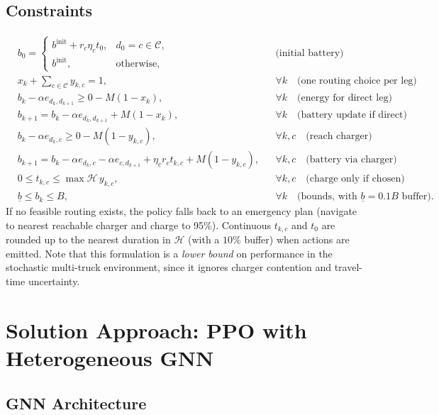 \documentclass[11pt]{article}
\begin{document}
\subsection*{Constraints}
\begin{align*}
&b_0 =
    \begin{cases}
        b^{\text{init}} + r_c\eta_c t_0, & d_0=c\in\mathcal{C},\\
        b^{\text{init}}, & \text{otherwise},
    \end{cases}
    &&\text{(initial battery)}\\
&x_k + \sum_{c\in\mathcal{C}} y_{k,c} = 1, &&\forall k \quad\text{(one routing choice per leg)}\\
&b_k - \alpha e_{d_k,d_{k+1}} \ge 0 - M(1-x_k), &&\forall k \quad\text{(energy for direct leg)}\\
&b_{k+1} = b_k - \alpha e_{d_k,d_{k+1}} + M(1-x_k), &&\forall k \quad\text{(battery update if direct)}\\
&b_k - \alpha e_{d_k,c} \ge 0 - M(1-y_{k,c}), &&\forall k,c \quad\text{(reach charger)}\\
&b_{k+1} = b_k - \alpha e_{d_k,c} - \alpha e_{c,d_{k+1}} + \eta_c r_c t_{k,c} + M(1-y_{k,c}), &&\forall k,c \quad\text{(battery via charger)}\\
&0 \le t_{k,c} \le \max \mathcal{H}\, y_{k,c}, &&\forall k,c \quad\text{(charge only if chosen)}\\
&\underline{b} \le b_k \le B, &&\forall k \quad\text{(bounds, with } \underline{b}=0.1B \text{ buffer)}.
\end{align*}
If no feasible routing exists, the policy falls back to an emergency plan (navigate to nearest reachable charger and charge to 95\%). Continuous $t_{k,c}$ and $t_0$ are rounded up to the nearest duration in $\mathcal{H}$ (with a $10\%$ buffer) when actions are emitted. Note that this formulation is a \emph{lower bound} on performance in the stochastic multi-truck environment, since it ignores charger contention and travel-time uncertainty.

\section{Solution Approach: PPO with Heterogeneous GNN}\label{sec:solution}

\subsection{GNN Architecture}
\end{document}
